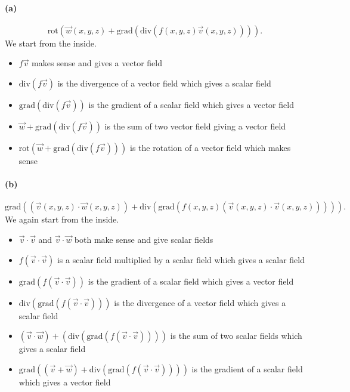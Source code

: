 \paragraph{(a)}
\[ 
\mathrm{rot}\left( \Vec{w}(x,y,z) + \mathrm{grad}\left( \mathrm{div}\left( f(x,y,z) \Vec{v}\left( x,y,z \right) \right) \right)  \right) 
.\]
\bigbreak
We start from the inside.
\begin{itemize}
  \item $f \Vec{v}$ makes sense and gives a vector field
  \item $\mathrm{div}(f \Vec{v})$ is the divergence of a vector field which gives a scalar field
  \item $\mathrm{grad}(\mathrm{div}(f \Vec{v}))$ is the gradient of a scalar field which gives a vector field
  \item $\Vec{w} + \mathrm{grad}(\mathrm{div}(f \Vec{v}))$ is the sum of two vector field giving a vector field
  \item $\mathrm{rot}\left( \Vec{w} + \mathrm{grad} \left( \mathrm{div} \left( f \Vec{v} \right) \right) \right)$ is the rotation of a vector field which makes sense
\end{itemize}

\paragraph{(b)}
\[ 
\mathrm{grad}\left( \left( \Vec{v} \left( x,y,z \right) \cdot \Vec{w}\left( x,y,z \right)  \right) + \mathrm{div} \left( \mathrm{grad} \left( f \left( x,y,z \right) \left( \Vec{v} \left( x,y,z \right) \cdot \Vec{v} \left( x,y,z \right)  \right)  \right)  \right)  \right) 
.\]
\bigbreak
We again start from the inside.
\begin{itemize}
  \item $\Vec{v} \cdot \Vec{v}$ and $\Vec{v} \cdot \Vec{w}$ both make sense and give scalar fields
  \item $f (\Vec{v} \cdot \Vec{v})$ is a scalar field multiplied by a scalar field which gives a scalar field
  \item $\mathrm{grad}\left( f \left( \Vec{v} \cdot \Vec{v} \right) \right)$ is the gradient of a scalar field which gives a vector field
  \item $\mathrm{div} \left( \mathrm{grad} \left( f \left( \Vec{v} \cdot \Vec{v} \right) \right) \right)$ is the divergence of a vector field which gives a scalar field
  \item $\left( \Vec{v} \cdot \Vec{w} \right) + \left( \mathrm{div} \left( \mathrm{grad}\left( f \left( \Vec{v}\cdot \Vec{v} \right) \right) \right) \right)$ is the sum of two scalar fields which gives a scalar field
  \item $\mathrm{grad} \left( \left( \Vec{v} + \Vec{w} \right) + \mathrm{div} \left( \mathrm{grad} \left( f \left( \Vec{v}\cdot \Vec{v} \right) \right) \right) \right)$ is the gradient of a scalar field which gives a vector field
\end{itemize}

